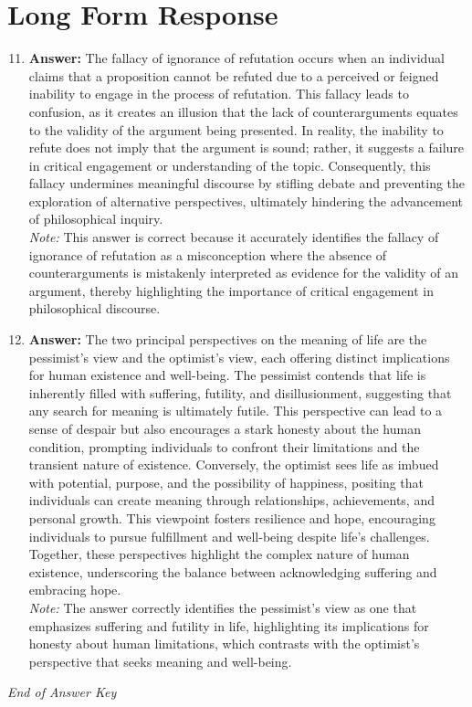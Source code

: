 \documentclass[12pt]{article}
\begin{document}
\section*{Long Form Response}
\begin{enumerate}[label=\arabic*.]
\setcounter{enumi}{10}
\item \textbf{Answer:} The fallacy of ignorance of refutation occurs when an individual claims that a proposition cannot be refuted due to a perceived or feigned inability to engage in the process of refutation. This fallacy leads to confusion, as it creates an illusion that the lack of counterarguments equates to the validity of the argument being presented. In reality, the inability to refute does not imply that the argument is sound; rather, it suggests a failure in critical engagement or understanding of the topic. Consequently, this fallacy undermines meaningful discourse by stifling debate and preventing the exploration of alternative perspectives, ultimately hindering the advancement of philosophical inquiry.
\\ \textit{Note:} This answer is correct because it accurately identifies the fallacy of ignorance of refutation as a misconception where the absence of counterarguments is mistakenly interpreted as evidence for the validity of an argument, thereby highlighting the importance of critical engagement in philosophical discourse.
\item \textbf{Answer:} The two principal perspectives on the meaning of life are the pessimist's view and the optimist's view, each offering distinct implications for human existence and well-being. The pessimist contends that life is inherently filled with suffering, futility, and disillusionment, suggesting that any search for meaning is ultimately futile. This perspective can lead to a sense of despair but also encourages a stark honesty about the human condition, prompting individuals to confront their limitations and the transient nature of existence. Conversely, the optimist sees life as imbued with potential, purpose, and the possibility of happiness, positing that individuals can create meaning through relationships, achievements, and personal growth. This viewpoint fosters resilience and hope, encouraging individuals to pursue fulfillment and well-being despite life's challenges. Together, these perspectives highlight the complex nature of human existence, underscoring the balance between acknowledging suffering and embracing hope.
\\ \textit{Note:} The answer correctly identifies the pessimist's view as one that emphasizes suffering and futility in life, highlighting its implications for honesty about human limitations, which contrasts with the optimist's perspective that seeks meaning and well-being.
\end{enumerate}

\vfill
\noindent\textit{End of Answer Key}
\end{document}

